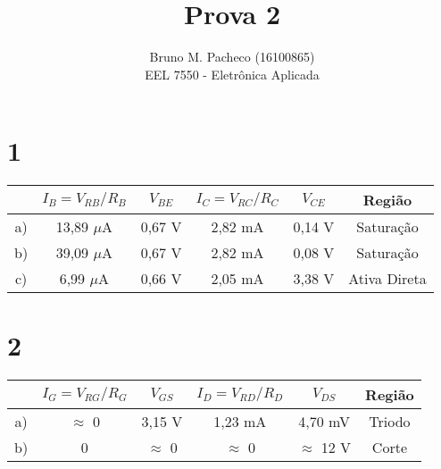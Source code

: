 \documentclass[a4paper]{report}
\begin{document}
 
\title{Prova 2}
\author{Bruno M. Pacheco (16100865)\\
EEL 7550 - Eletrônica Aplicada}
 
\maketitle

\section*{1}

\begin{table}[h]
    \centering
    \begin{tabular}{c | c | c | c | c | c}
     & $I_B = V_{RB}/R_B$ & $V_{BE}$ & $I_C = V_{RC}/R_C$ & $V_{CE}$ & Região \\
     \hline
	a) & 13,89 $\mu$A & 0,67 V & 2,82 mA & 0,14 V & Saturação \\
	b) & 39,09 $\mu$A & 0,67 V & 2,82 mA & 0,08 V & Saturação \\
	c) & 6,99 $\mu$A & 0,66 V & 2,05 mA & 3,38 V & Ativa Direta
    \end{tabular}
\end{table}

\section*{2}

\begin{table}[h]
    \centering
    \begin{tabular}{c | c | c | c | c | c}
     & $I_G = V_{RG}/R_G$ & $V_{GS}$ & $I_D = V_{RD}/R_D$ & $V_{DS}$ & Região \\
     \hline
	a) & $\approx$ 0 & 3,15 V & 1,23 mA & 4,70 mV & Triodo \\
	b) & 0 & $\approx$ 0 & $\approx$ 0 & $\approx$ 12 V & Corte \\
    \end{tabular}
\end{table}
\end{document}
